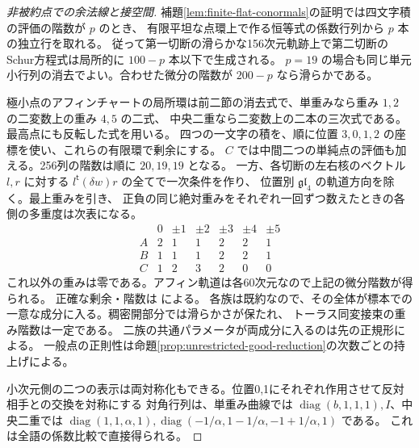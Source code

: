 \begin{proof}[非被約点での余法線と接空間]
補題\ref{lem:finite-flat-conormals}の証明では四文字積の評価の階数が $p$ のとき、
有限平坦な点環上で作る恒等式の係数行列から $p$ 本の独立行を取れる。
従って第一切断の滑らかな156次元軌跡上で第二切断のSchur方程式は局所的に $100-p$ 本以下で生成される。
$p=19$ の場合も同じ単元小行列の消去でよい。合わせた微分の階数が $200-p$ なら滑らかである。

極小点のアフィンチャートの局所環は前二節の消去式で、単重みなら重み $1,2$ の二変数上の重み $4,5$ の二式、
中央二重なら二変数上の二本の三次式である。最高点にも反転した式を用いる。
四つの一文字の積を、順に位置 $3,0,1,2$ の座標を使い、これらの有限環で剰余にする。
$C$ では中間二つの単純点の評価も加える。256列の階数は順に $20,19,19$ となる。
一方、各切断の左右核のベクトル $l,r$ に対する $l^{\mathsf t}(\delta w)r$ の全てで一次条件を作り、
位置別 $\mathfrak{gl}_4$ の軌道方向を除く。最上重みを引き、
正負の同じ絶対重みをそれぞれ一回ずつ数えたときの各側の多重度は次表になる。
\[
\begin{array}{c|c|ccccc}
 &0&\pm1&\pm2&\pm3&\pm4&\pm5\\\hline
 A&2&1&1&2&2&1\\
 B&1&1&1&2&2&1\\
 C&1&2&3&2&0&0
\end{array}
\]
これ以外の重みは零である。アフィン軌道は各60次元なので上記の微分階数が得られる。
正確な剰余・階数は  による。
各族は既約なので、その全体が標本での一意な成分に入る。稠密開部分では滑らかさが保たれ、
トーラス同変接束の重み階数は一定である。
二族の共通パラメータが両成分に入るのは先の正規形による。
一般点の正則性は命題\ref{prop:unrestricted-good-reduction}の次数ごとの持上げによる。

小次元側の二つの表示は両対称化もできる。位置0,1にそれぞれ作用させて反対相手との交換を対称にする
対角行列は、単重み曲線では $\operatorname{diag}(b,1,1,1),I$、中央二重では
$\operatorname{diag}(1,1,\alpha,1),\operatorname{diag}(-1/\alpha,1-1/\alpha,-1+1/\alpha,1)$ である。
これは全語の係数比較で直接得られる。
\end{proof}

